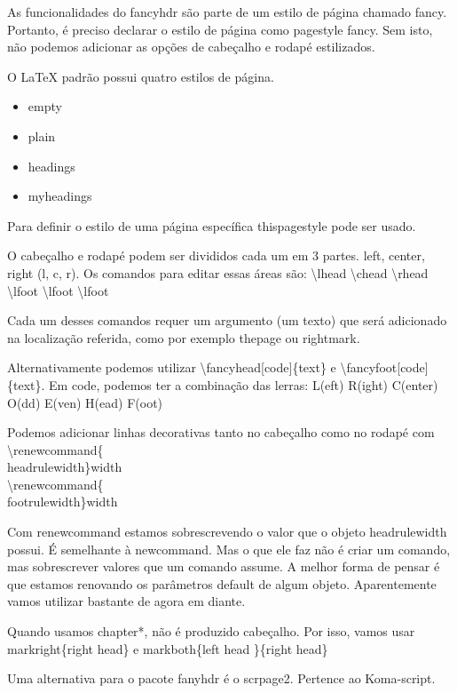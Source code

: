 As funcionalidades do fancyhdr são parte de um estilo de página chamado fancy.
Portanto, é preciso declarar o estilo de página como pagestyle fancy.
Sem isto, não podemos adicionar as opções de cabeçalho e rodapé estilizados.

O LaTeX padrão possui quatro estilos de página.
\begin{itemize}
    \item empty
    \item plain
    \item headings
    \item myheadings
\end{itemize}

Para definir o estilo de uma página específica thispagestyle pode ser usado.

O cabeçalho e rodapé podem ser divididos cada um em 3 partes.
left, center, right (l, c, r).
Os comandos para editar essas áreas são:
\textbackslash lhead \textbackslash chead \textbackslash rhead 
\textbackslash lfoot \textbackslash lfoot \textbackslash lfoot 

Cada um desses comandos requer um argumento (um texto) que será adicionado
na localização referida, como por exemplo thepage ou rightmark.

Alternativamente podemos utilizar \textbackslash fancyhead[code]\{text\} e
\textbackslash fancyfoot[code]\{text\}.
Em code, podemos ter a combinação das lerras:
L(eft) R(ight) C(enter) O(dd) E(ven) H(ead) F(oot)

Podemos adicionar linhas decorativas tanto no cabeçalho como no rodapé com\\
\textbackslash renewcommand\{\\headrulewidth\}{width}\\
\textbackslash renewcommand\{\\footrulewidth\}{width}

Com renewcommand estamos sobrescrevendo o valor que o objeto headrulewidth possui.
É semelhante à newcommand.
Mas o que ele faz não é criar um comando, mas sobrescrever valores que um comando assume.
A melhor forma de pensar é que estamos renovando os parâmetros default de algum objeto.
Aparentemente vamos utilizar bastante de agora em diante.

Quando usamos chapter*, não é produzido cabeçalho.
Por isso, vamos usar \\
markright\{right head\} e markboth\{left head \}\{right head\}

Uma alternativa para o pacote fanyhdr é o scrpage2.
Pertence ao Koma-script.

